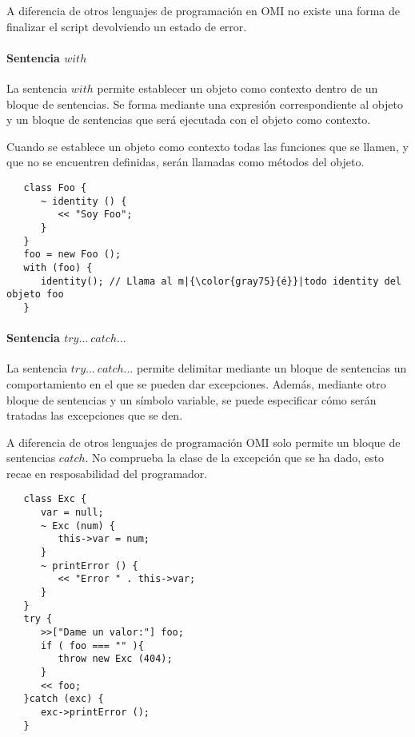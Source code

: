 A diferencia de otros lenguajes de programación en OMI no existe una forma de finalizar el script 
devolviendo un estado de error.

\paragraph{Sentencia $with$} \label{sec:stmt_with}

La sentencia $with$ permite establecer un objeto como contexto dentro de un bloque de sentencias. Se forma mediante
una expresión correspondiente al objeto y un bloque de sentencias que será ejecutada con el objeto como contexto. 

Cuando se establece un objeto como contexto todas las funciones que se llamen, y que no se encuentren definidas, serán 
llamadas como métodos del objeto. \\

\begin{lstlisting}
   class Foo {
      ~ identity () {
         << "Soy Foo";
      } 
   }
   foo = new Foo ();
   with (foo) {
      identity(); // Llama al m|{\color{gray75}{é}}|todo identity del objeto foo
   }
\end{lstlisting}

\paragraph{Sentencia $try...\ catch...$} \label{sec:stmt_try}

La sentencia $try...\ catch...$ permite delimitar mediante un bloque de sentencias 
un comportamiento en el que se pueden dar excepciones. Además, mediante otro 
bloque de sentencias y un símbolo variable, se puede especificar cómo serán tratadas
las excepciones que se den.

A diferencia de otros lenguajes de programación OMI solo permite un bloque de 
sentencias $catch$. No comprueba la clase de la excepción que se ha dado, esto recae
en resposabilidad del programador. \\

\begin{lstlisting}
   class Exc {
      var = null;
      ~ Exc (num) {
         this->var = num;
      }
      ~ printError () {
         << "Error " . this->var;
      }
   }
   try {
      >>["Dame un valor:"] foo;
      if ( foo === "" ){
         throw new Exc (404);
      } 
      << foo;
   }catch (exc) {
      exc->printError ();
   }
\end{lstlisting}

